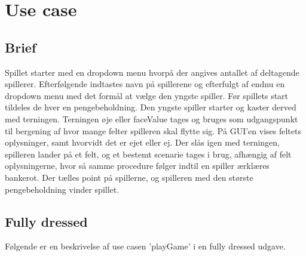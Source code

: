 \pagebreak

\section{Use case}
\subsection{Brief}
Spillet starter med en dropdown menu hvorpå der angives antallet af deltagende spillerer.
Efterfølgende indtastes navn på spillerene og efterfulgt af endnu en dropdown menu med det formål at vælge den yngste spiller.
Før spillets start tildeles de hver en pengebeholdning.
Den yngste spiller starter og kaster derved med terningen.
Terningen øje eller faceValue tages og bruges som udgangspunkt til bergening af hvor mange felter spilleren skal flytte sig.
På GUI'en vises feltets oplysninger, samt hvorvidt det er ejet eller ej.
Der slås igen med terningen, spilleren lander på et felt, og et bestemt scenarie tages i brug, afhængig af felt oplysningerne, hvor så samme procedure følger indtil en spiller ærklæres bankerot.
Der tælles point på spillerne, og spilleren med den største pengebeholdning vinder spillet.\\

\subsection{Fully dressed}
Følgende er en beskrivelse af use casen 'playGame' i en fully dressed udgave.

